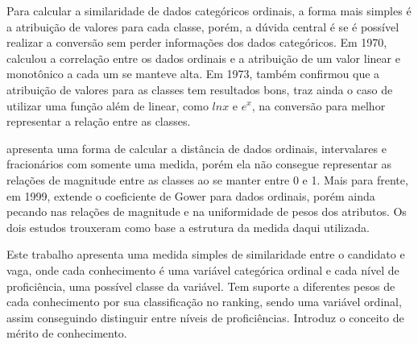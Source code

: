 \documentclass[preprint,12pt]{elsarticle}
\begin{document}


Para calcular a similaridade de dados categóricos ordinais, a forma mais simples é a atribuição de valores para cada classe, porém, a dúvida central é se é possível realizar a conversão sem perder informações dos dados categóricos. Em 1970, \cite{assignment-rank-order-1970} calculou a correlação entre os dados ordinais e a atribuição de um valor linear e monotônico a cada um se manteve alta. Em 1973, \cite{ANDERBERG197325} também confirmou que a atribuição de valores para as classes tem resultados bons, traz ainda o caso de utilizar uma função além de linear, como $ln x$ e $e^x$, na conversão para melhor representar a relação entre as classes.

\cite{analysis-cluster} apresenta uma forma de calcular a distância de dados ordinais, intervalares e fracionários com somente uma medida, porém ela não consegue representar as relações de magnitude entre as classes ao se manter entre 0 e 1. Mais para frente, em 1999, \cite{analysis-cluster} extende o coeficiente de Gower para dados ordinais, porém ainda pecando nas relações de magnitude e na uniformidade de pesos dos atributos. Os dois estudos trouxeram como base a estrutura da medida daqui utilizada.

Este trabalho apresenta uma medida simples de similaridade entre o candidato e vaga, onde cada conhecimento é uma variável categórica ordinal e cada nível de proficiência, uma possível classe da variável. Tem suporte a diferentes pesos de cada conhecimento por sua classificação no ranking, sendo uma variável ordinal, assim conseguindo distinguir entre níveis de proficiências. Introduz o conceito de mérito de conhecimento.
\end{document}
